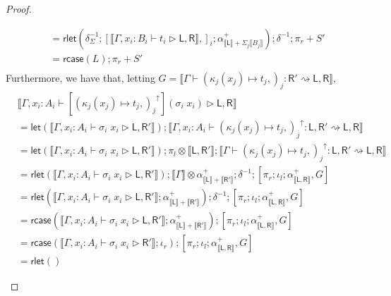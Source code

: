 \documentclass[acmsmall,screen,review]{acmart}
\newcommand{\ms}[1]{\ensuremath{\mathsf{#1}}}
\newcommand{\upg}[1]{{#1}^\uparrow}
\newcommand{\bhyp}[2]{#1 : #2}
\newcommand{\haslb}[3]{#1 \vdash #2 \rhd #3}
\newcommand{\lbsubst}[4]{#1 \vdash #2: #3 \rightsquigarrow #4}
\newcommand{\dnt}[1]{\llbracket{#1}\rrbracket}
\newcommand{\lmor}[1]{\ms{let}(#1)}
\newcommand{\rlmor}[1]{\ms{rlet}(#1)}
\newcommand{\rcase}[1]{\ms{rcase}(#1)}
\begin{document}
\begin{proof}
\begin{itemize}[leftmargin=*]
\begin{equation}
\begin{aligned}
        & = \rlmor{
            \delta^{-1}_\Sigma
            ; [ \dnt{\haslb{\Gamma, \bhyp{x_i}{B_i}}{t_i}{\ms{L}, \ms{R}}},]_i
            ; \alpha^+_{\dnt{\ms{L}} + \Sigma_j\dnt{B_j}}}
          ; \delta^{-1} ; \pi_r + S'
          \\
        & = \rcase{L} ; \pi_r + S'
          \\
      \end{aligned}
    \end{equation}
    Furthermore, we have that, letting 
    $G = \dnt{\lbsubst{\Gamma}{(\kappa_j(x_j) \mapsto t_j,)_j}{\ms{R}'}{\ms{L}, \ms{R}}}$,
    \begin{equation}
      \begin{aligned}
        & \dnt{\haslb
          {\Gamma, \bhyp{x_i}{A_i}}{[\upg{(\kappa_j(x_j) \mapsto t_j,)_j}](\sigma_i\;x_i)}
          {\ms{L}, \ms{R}}} \\
        & = \lmor{\dnt{\haslb{\Gamma, \bhyp{x_i}{A_i}}{\sigma_i\;x_i}{\ms{L}, \ms{R}'}}}
          ; \dnt{\lbsubst{\Gamma, \bhyp{x_i}{A_i}}{\upg{(\kappa_j(x_j) \mapsto t_j,)_j}}
            {\ms{L}, \ms{R}'}{\ms{L}, \ms{R}}} \\
        & = \lmor{\dnt{\haslb{\Gamma, \bhyp{x_i}{A_i}}{\sigma_i\;x_i}{\ms{L}, \ms{R}'}}}
          ; \pi_l \otimes \dnt{\ms{L}, \ms{R'}} 
          ; \dnt{\lbsubst{\Gamma}{\upg{(\kappa_j(x_j) \mapsto t_j,)_j}}
            {\ms{L}, \ms{R}'}{\ms{L}, \ms{R}}} \\
        & = \rlmor{\dnt{\haslb{\Gamma, \bhyp{x_i}{A_i}}{\sigma_i\;x_i}{\ms{L}, \ms{R}'}}}
        ; \dnt{\Gamma} \otimes \alpha^+_{\dnt{\ms{L}} + \dnt{\ms{R}'}}
        ; \delta^{-1}
        ; [\pi_r ; \iota_l ; \alpha^+_{\dnt{\ms{L}, \ms{R}}} , G]
         \\
        & = \rlmor{
          \dnt{\haslb{\Gamma, \bhyp{x_i}{A_i}}{\sigma_i\;x_i}{\ms{L}, \ms{R}'}}
          ; \alpha^+_{\dnt{\ms{L}} + \dnt{\ms{R}'}}
        } ; \delta^{-1} 
        ; [\pi_r ; \iota_l ; \alpha^+_{\dnt{\ms{L}, \ms{R}}} , G] \\
        & = \rcase{
          \dnt{\haslb{\Gamma, \bhyp{x_i}{A_i}}{\sigma_i\;x_i}{\ms{L}, \ms{R}'}}
          ; \alpha^+_{\dnt{\ms{L}} + \dnt{\ms{R}'}}
        }
        ; [\pi_r ; \iota_l ; \alpha^+_{\dnt{\ms{L}, \ms{R}}} , G] \\
        & = \rcase{
          \dnt{\haslb{\Gamma, \bhyp{x_i}{A_i}}{\sigma_i\;x_i}{\ms{R}'}}
          ; \iota_r
        }
        ; [\pi_r ; \iota_l ; \alpha^+_{\dnt{\ms{L}, \ms{R}}} , G] \\
        & = \rlmor{
}
\end{aligned}
\end{equation}
\end{itemize}
\end{proof}
\end{document}
